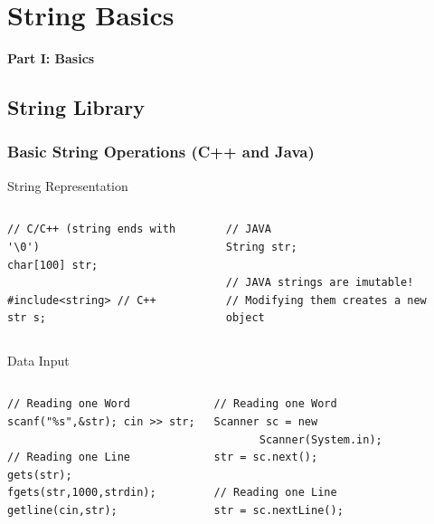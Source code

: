 

\section{String Basics}

\begin{frame}
  \begin{center}
    {\bf Part I: Basics}
  \end{center}
\end{frame}

\subsection{String Library}

\begin{frame}[fragile]
  \frametitle{Basic String Operations (C++ and Java)}
  {\smaller
    \begin{block}{String Representation}
      \begin{columns}[T]
\begin{verbatim}
// C/C++ (string ends with '\0')
char[100] str;

#include<string> // C++
str s;
\end{verbatim}
\begin{verbatim}
// JAVA
String str;

// JAVA strings are imutable!
// Modifying them creates a new object
\end{verbatim}
      \end{columns}
    \end{block}

    \begin{block}{Data Input}
      \begin{columns}[T]
\begin{verbatim}
// Reading one Word
scanf("%s",&str); cin >> str;

// Reading one Line
gets(str);
fgets(str,1000,strdin);
getline(cin,str);
\end{verbatim}
\begin{verbatim}
// Reading one Word
Scanner sc = new
       Scanner(System.in);
str = sc.next();

// Reading one Line
str = sc.nextLine();
\end{verbatim}
      \end{columns}
    \end{block}
  }
\end{frame}

